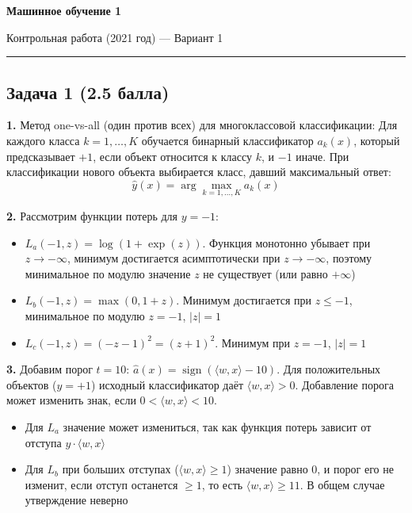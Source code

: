 \documentclass[a4paper,12pt]{article}
\begin{document}
\begin{center}
\Large\textbf{Машинное обучение 1}
\end{center}
\begin{center}
\large Контрольная работа (2021 год) --- Вариант 1
\end{center}
\hrule
\vspace{1cm}

\subsection*{Задача 1 (2.5 балла)}

\textbf{1.} Метод one-vs-all (один против всех) для многоклассовой классификации:
Для каждого класса \(k = 1,\dots,K\) обучается бинарный классификатор \(a_k(x)\), который предсказывает \(+1\), если объект относится к классу \(k\), и \(-1\) иначе.
При классификации нового объекта выбирается класс, давший максимальный ответ:
\[
\hat{y}(x) = \arg\max_{k=1,\dots,K} a_k(x)
\]

\bigskip

\textbf{2.} Рассмотрим функции потерь для \(y = -1\):
\begin{itemize}
  \item \(L_a(-1, z) = \log(1 + \exp(z))\). Функция монотонно убывает при \(z \to -\infty\), минимум достигается асимптотически при \(z \to -\infty\), поэтому минимальное по модулю значение \(z\) не существует (или равно \(+\infty\))
  \item \(L_b(-1, z) = \max(0, 1 + z)\). Минимум достигается при \(z \le -1\), минимальное по модулю \(z = -1\), \(|z| = 1\)
  \item \(L_c(-1, z) = (-z - 1)^2 = (z + 1)^2\). Минимум при \(z = -1\), \(|z| = 1\)
\end{itemize}

\bigskip

\textbf{3.} Добавим порог \(t = 10\): \(\hat{a}(x) = \operatorname{sign}(\langle w, x \rangle - 10)\).
Для положительных объектов (\(y = +1\)) исходный классификатор даёт \(\langle w, x \rangle > 0\).
Добавление порога может изменить знак, если \(0 < \langle w, x \rangle < 10\).
\begin{itemize}
  \item Для \(L_a\) значение может измениться, так как функция потерь зависит от отступа \(y \cdot \langle w, x \rangle\)
  \item Для \(L_b\) при больших отступах (\(\langle w, x \rangle \ge 1\)) значение равно 0, и порог его не изменит, если отступ останется \(\ge 1\), то есть \(\langle w, x \rangle \ge 11\). В общем случае утверждение неверно
\end{itemize}
\end{document}
